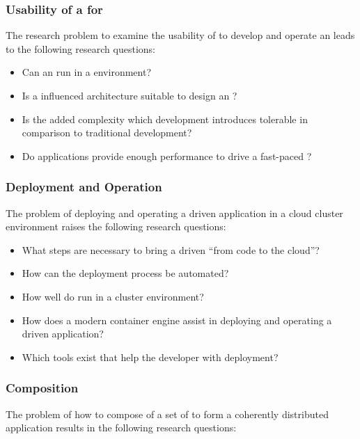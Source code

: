 \subsubsection{Usability of a \ms{} for \ogs{}} 

The research problem to examine the usability of \mss{} to develop and operate
an \og{} leads to the following research questions:

\begin{itemize}
  \item Can an \og{} run in a \ms{} environment?
  \item Is a \ms{} influenced architecture suitable to design an \og{}?
  \item Is the added complexity which \ms{} development introduces tolerable
  in comparison to traditional \og{} development?
  \item Do \ms{} applications provide enough performance to drive a fast-paced
  \og{}?
\end{itemize}

\subsubsection{Deployment and Operation}

The problem of deploying and operating a \ms{} driven \og{} application in a cloud
cluster environment raises the following research questions:

\begin{itemize}
  \item What steps are necessary to bring a \ms{} driven \og{} ``from code to
  the cloud''?
  \item How can the deployment process be automated?
  \item How well do \ogs{} run in a cluster environment?
  \item How does a modern container engine assist in deploying and operating a
  \ms{} driven application?
  \item Which tools exist that help the developer with deployment?
\end{itemize}

\subsubsection{\ms{} Composition}
The problem of how to compose of a set of \mss{} to form a coherently
distributed application results in the following research questions:


